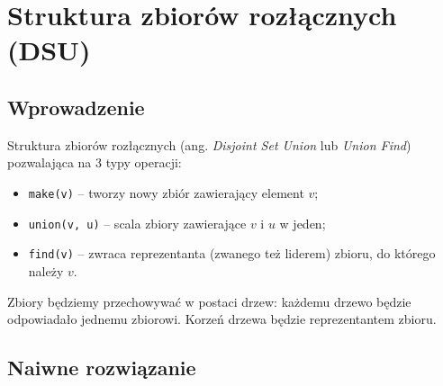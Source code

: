\documentclass[../main.tex]{subfiles}
\begin{document}
\section{Struktura zbiorów rozłącznych (DSU)}

\subsection{Wprowadzenie}

\begin{frame}{\subsecname}
  
Struktura zbiorów rozłącznych (ang. \textit{Disjoint Set Union} lub \textit{Union Find})
pozwalająca na 3 typy operacji:
\begin{itemize}
  \item \lstinline{make(v)}     -- tworzy nowy zbiór zawierający element $v$;
  \item \lstinline{union(v, u)} -- scala zbiory zawierające $v$ i $u$ w jeden;
  \item \lstinline{find(v)}     -- zwraca reprezentanta (zwanego też liderem) zbioru, do którego
                                   należy $v$.
\end{itemize}

\end{frame}

\begin{frame}{\subsecname}

Zbiory będziemy przechowywać w postaci drzew: każdemu drzewo będzie odpowiadało jednemu zbiorowi.
Korzeń drzewa będzie reprezentantem zbioru.


\end{frame}

\subsection{Naiwne rozwiązanie}
\end{document}
